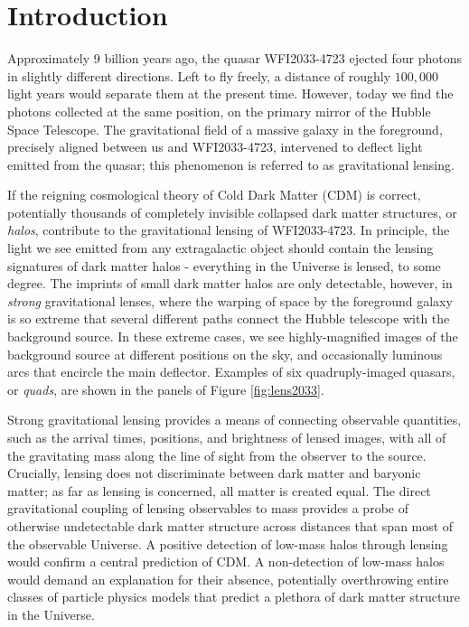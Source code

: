 
%
%

\chapter{Introduction}

\indent Approximately 9 billion years ago, the quasar WFI2033-4723 ejected four photons in slightly different directions. Left to fly freely, a distance of roughly $100,000$ light years would separate them at the present time. However, today we find the photons collected at the same position, on the primary mirror of the Hubble Space Telescope. The gravitational field of a massive galaxy in the foreground, precisely aligned between us and WFI2033-4723, intervened to deflect light emitted from the quasar; this phenomenon is referred to as gravitational lensing. 

If the reigning cosmological theory of Cold Dark Matter (CDM) is correct, potentially thousands of completely invisible collapsed dark matter structures, or \textit{halos}, contribute to the gravitational lensing of WFI2033-4723. In principle, the light we see emitted from any extragalactic object should contain the lensing signatures of dark matter halos - everything in the Universe is lensed, to some degree. The imprints of small dark matter halos are only detectable, however, in \textit{strong} gravitational lenses, where the warping of space by the foreground galaxy is so extreme that several different paths connect the Hubble telescope with the background source. In these extreme cases, we see highly-magnified images of the background source at different positions on the sky, and occasionally luminous arcs that encircle the main deflector. Examples of six quadruply-imaged quasars, or \textit{quads}, are shown in the panels of Figure \ref{fig:lens2033}.

Strong gravitational lensing provides a means of connecting observable quantities, such as the arrival times, positions, and brightness of lensed images, with all of the gravitating mass along the line of sight from the observer to the source. Crucially, lensing does not discriminate between dark matter and baryonic matter; as far as lensing is concerned, all matter is created equal. The direct gravitational coupling of lensing observables to mass provides a probe of otherwise undetectable dark matter structure across distances that span most of the observable Universe. A positive detection of low-mass halos through lensing would confirm a central prediction of CDM. A non-detection of low-mass halos would demand an explanation for their absence, potentially overthrowing entire classes of particle physics models that predict a plethora of dark matter structure in the Universe. 

